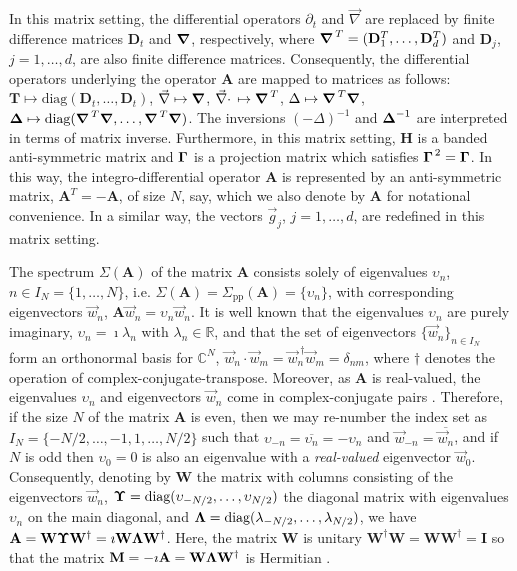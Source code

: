 \documentclass[11pt]{amsart}
\newcommand{\Sigp}{\Sigma_{\text{pp}}}
\newcommand{\Mb}{\mathbf{M}}
\newcommand{\Tb}{\mathbf{T}}
\newcommand{\Hb}{\mathbf{H}}
\newcommand{\Ib}{\mathbf{I}}
\newcommand{\Ab}{\mathbf{A}}
\newcommand{\Db}{\mathbf{D}}
\newcommand{\Wb}{\mathbf{W}}
\newcommand\bDelta{\mbox{\boldmath${\Delta}$}}
\newcommand\bGamma{\mbox{\boldmath${\Gamma}$}}
\newcommand\bUpsilon{\mbox{\boldmath${\Upsilon}$}}
\newcommand\bLambda{\mbox{\boldmath${\Lambda}$}}
\newcommand\Bnabla{\mbox{\boldmath${\nabla}$}}
\begin{document}
In this matrix setting, the differential operators $\partial_t$ and $\vec{\nabla}$
are replaced by finite difference matrices $\Db_t$ and $\Bnabla$,
respectively, where $\Bnabla^{\,T}=(\Db_1^T,\ldots,\Db_d^T)$ and $\Db_j$,
$j=1,\ldots,d$, are also finite difference matrices. Consequently, the
differential operators underlying the operator $\Ab$ are mapped to
matrices as follows: $\Tb\mapsto\text{diag}(\Db_t,\ldots,\Db_t)$,
$\vec{\nabla}\mapsto\Bnabla$, $\vec{\nabla}\cdot\,\mapsto\Bnabla^{\,T}$,
$\Delta\mapsto\Bnabla^{\,T}\Bnabla$,
$\bDelta\mapsto\text{diag}(\Bnabla^{\,T}\Bnabla,\ldots,\Bnabla^{\,T}\Bnabla)$. The
inversions $(-\Delta)^{-1}$ and $\bDelta^{-1}$ are interpreted in terms of
matrix inverse. Furthermore, in this matrix setting, $\Hb$ is a banded
anti-symmetric matrix and $\bGamma$ is a projection matrix which
satisfies $\bGamma^{\,2}=\bGamma$. In this way, the
integro-differential operator $\Ab$ is represented by an
anti-symmetric matrix, $\Ab^T=-\Ab$, of size $N$, say, which we also
denote by $\Ab$ for notational convenience. In a similar way,
the vectors $\vec{g}_j$, $j=1,\ldots,d$, are redefined in this matrix setting.    





 


 
 The spectrum $\Sigma(\Ab)$ of the matrix $\Ab$ consists solely of 
 eigenvalues $\upsilon_n$, $n\in I_N=\{1,\ldots,N\}$, i.e. $\Sigma(\Ab)=\Sigp(\Ab)=\{\upsilon_n\}$,
 with  corresponding eigenvectors  $\vec{w}_n$,
 $\Ab\vec{w}_n=\upsilon_n\vec{w}_n$. It is well known
 \cite{Horn_Johnson-1990} that the eigenvalues $\upsilon_n$ are purely 
imaginary, $\upsilon_n=\imath\lambda_n$ with $\lambda_n\in\mathbb{R}$, and that the set of
eigenvectors $\{\vec{w}_n\}_{n\in I_N}$ form an orthonormal basis
\cite{Keener-2000} for $\mathbb{C}^N$,
$\vec{w}_n\cdot\vec{w}_m=\vec{w}_n^{\;\dagger}\vec{w}_m=\delta_{nm}$, where $\dagger$ 
denotes the operation of complex-conjugate-transpose. Moreover, as 
$\Ab$ is real-valued, the eigenvalues $\upsilon_n$ and eigenvectors
$\vec{w}_n$ come in complex-conjugate pairs
\cite{Horn_Johnson-1990}. Therefore, if the size $N$ of the matrix
$\Ab$ is even, then we may re-number the index set as
$I_N=\{-N/2,\ldots,-1,1,\ldots ,N/2\}$ such that $\upsilon_{-n}=\overline{\upsilon_n}=-\upsilon_n$ and
$\vec{w}_{-n}=\overline{\vec{w}_n}$, and if $N$ is odd then $\upsilon_0=0$ is
also an eigenvalue with a \emph{real-valued} eigenvector
$\vec{w}_0$. Consequently, denoting by $\Wb$ the matrix with columns
consisting of the eigenvectors $\vec{w}_n$,
$\bUpsilon=\text{diag}(\upsilon_{-N/2},\ldots,\upsilon_{N/2})$ the diagonal matrix with
eigenvalues $\upsilon_n$ on the main diagonal, and
$\bLambda=\text{diag}(\lambda_{-N/2},\ldots,\lambda_{N/2})$, we have
$\Ab=\Wb\bUpsilon\Wb^\dagger=\imath\Wb\bLambda\Wb^\dagger$. Here, the matrix $\Wb$ is
unitary $\Wb^\dagger\Wb=\Wb\Wb^\dagger=\Ib$ so that the matrix
$\Mb=-\imath\Ab=\Wb\bLambda\Wb^\dagger$ is Hermitian 
\cite{Horn_Johnson-1990,Keener-2000}.  
\end{document}
